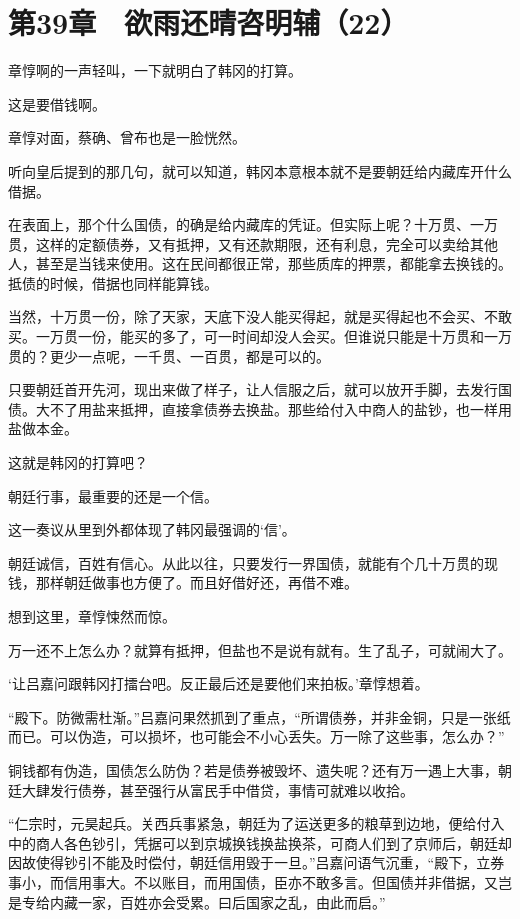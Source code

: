 \section{第39章　欲雨还晴咨明辅（22）}

章惇啊的一声轻叫，一下就明白了韩冈的打算。

这是要借钱啊。

章惇对面，蔡确、曾布也是一脸恍然。

听向皇后提到的那几句，就可以知道，韩冈本意根本就不是要朝廷给内藏库开什么借据。

在表面上，那个什么国债，的确是给内藏库的凭证。但实际上呢？十万贯、一万贯，这样的定额债券，又有抵押，又有还款期限，还有利息，完全可以卖给其他人，甚至是当钱来使用。这在民间都很正常，那些质库的押票，都能拿去换钱的。抵债的时候，借据也同样能算钱。

当然，十万贯一份，除了天家，天底下没人能买得起，就是买得起也不会买、不敢买。一万贯一份，能买的多了，可一时间却没人会买。但谁说只能是十万贯和一万贯的？更少一点呢，一千贯、一百贯，都是可以的。

只要朝廷首开先河，现出来做了样子，让人信服之后，就可以放开手脚，去发行国债。大不了用盐来抵押，直接拿债券去换盐。那些给付入中商人的盐钞，也一样用盐做本金。

这就是韩冈的打算吧？

朝廷行事，最重要的还是一个信。

这一奏议从里到外都体现了韩冈最强调的‘信’。

朝廷诚信，百姓有信心。从此以往，只要发行一界国债，就能有个几十万贯的现钱，那样朝廷做事也方便了。而且好借好还，再借不难。

想到这里，章惇悚然而惊。

万一还不上怎么办？就算有抵押，但盐也不是说有就有。生了乱子，可就闹大了。

‘让吕嘉问跟韩冈打擂台吧。反正最后还是要他们来拍板。’章惇想着。

“殿下。防微需杜渐。”吕嘉问果然抓到了重点，“所谓债券，并非金铜，只是一张纸而已。可以伪造，可以损坏，也可能会不小心丢失。万一除了这些事，怎么办？”

铜钱都有伪造，国债怎么防伪？若是债券被毁坏、遗失呢？还有万一遇上大事，朝廷大肆发行债券，甚至强行从富民手中借贷，事情可就难以收拾。

“仁宗时，元昊起兵。关西兵事紧急，朝廷为了运送更多的粮草到边地，便给付入中的商人各色钞引，凭据可以到京城换钱换盐换茶，可商人们到了京师后，朝廷却因故使得钞引不能及时偿付，朝廷信用毁于一旦。”吕嘉问语气沉重，“殿下，立券事小，而信用事大。不以账目，而用国债，臣亦不敢多言。但国债并非借据，又岂是专给内藏一家，百姓亦会受累。曰后国家之乱，由此而启。”

